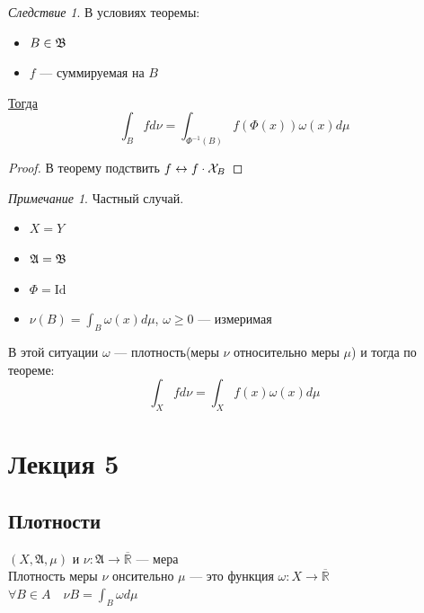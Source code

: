 \documentclass[russ,oneside]{book}
\newcommand{\R}{\mathbb{R}}
\theoremstyle{plain}
\theoremstyle{remark}
\newtheorem*{remark}{Примечание}
\newtheorem{corollary}{Следствие}[theorem]
\theoremstyle{definition}
\begin{document}
\begin{corollary}
В условиях теоремы:
\begin{itemize}
\item \(B \in \B\)
\item \(f\) --- суммируемая на \(B\)
\end{itemize}
\uline{Тогда} \[ \int_B f d\nu = \int_{\Phi^{-1}(B)}f(\Phi(x))\omega(x)d\mu\]
\end{corollary}
\begin{proof}
В теорему подствить \(f \leftrightarrow f\cdot\X_{B}\)
\end{proof}
\begin{remark}
Частный случай.
\begin{itemize}
\item \(X = Y\)
\item \(\A = \B\)
\item \(\Phi = \text{Id}\)
\item \(\nu(B) = \int_B\omega(x)d\mu\), \(\omega \ge 0\) --- измеримая
\end{itemize}
В этой ситуации \(\omega\) --- плотность(меры \(\nu\) относительно меры \(\mu\)) и тогда по теореме:
\[ \int_X f d\nu = \int_X f(x)\omega(x)d\mu \]
\end{remark}
\chapter{Лекция 5}
\label{sec:orgce88b4d}
\newcommand{\X}{\mathcal{X}}
\newcommand{\A}{\mathfrak{A}}
\newcommand{\B}{\mathfrak{B}}
\newcommand{\M}{\mathfrak{M}}

\section{Плотности}
\label{sec:org4594479}

 \((X, \A, \mu)\) и \(\nu: \A \to \overline{\R}\) --- мера \\
Плотность  меры \(\nu\) онсительно \(\mu\) --- это функция \(\omega: X \to \overline{\R}\) \\
\(\forall B \in A\quad \nu B = \int_B \omega d\mu\)
\end{document}
